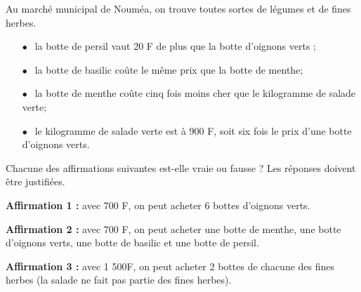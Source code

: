 
\medskip

Au marché municipal de Nouméa, on trouve toutes sortes de légumes et de fines herbes. 

\setlength\parindent{6mm}
\begin{itemize}
\item[$\bullet~~$] la botte de persil vaut 20 F de plus que la botte d'oignons verts ; 
\item[$\bullet~~$] la botte de basilic coûte le même prix que la botte de menthe; 
\item[$\bullet~~$] la botte de menthe coûte cinq fois moins cher que le kilogramme de salade verte; 
\item[$\bullet~~$] le kilogramme de salade verte est à 900 F, soit six fois le prix d'une botte d'oignons verts.
\end{itemize}
\setlength\parindent{0mm} 

Chacune des affirmations suivantes est-elle vraie ou fausse ? Les réponses doivent être justifiées.

\medskip 

\textbf{Affirmation 1 :} avec 700 F, on peut acheter 6 bottes d'oignons verts. 

\textbf{Affirmation 2 :} avec 700 F, on peut acheter une botte de menthe, une botte d'oignons verts, une botte de basilic et une botte de persil. 

\textbf{Affirmation 3 :} avec 1 500F, on peut acheter 2 bottes de chacune des fines herbes (la salade ne fait pas partie des fines herbes). 

\vspace{0,5cm}

